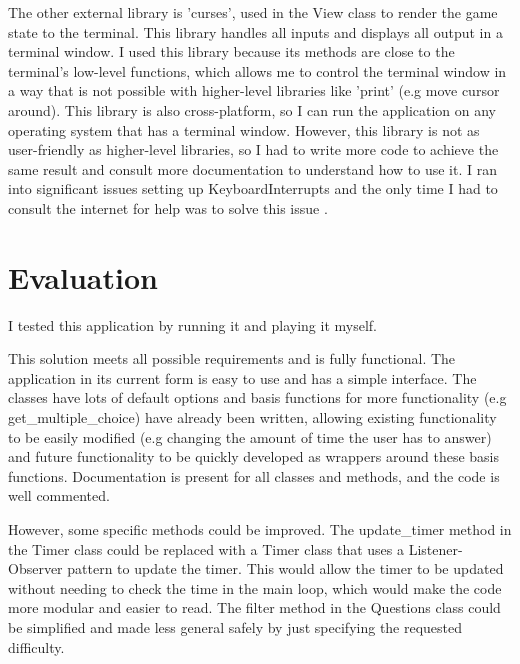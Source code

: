 \documentclass[12pt]{article}
\begin{document}
\vspace{\baselineskip}

The other external library is 'curses', used in the View class to render the game state to the terminal. This library handles all inputs and displays all output in a terminal window. I used this library because its methods are close to the terminal's low-level functions, which allows me to control the terminal window in a way that is not possible with higher-level libraries like 'print' (e.g move cursor around). This library is also cross-platform, so I can run the application on any operating system that has a terminal window. However, this library is not as user-friendly as higher-level libraries, so I had to write more code to achieve the same result and consult more documentation to understand how to use it. I ran into significant issues setting up KeyboardInterrupts and the only time I had to consult the internet for help was to solve this issue \cite{web:2}.

\section{Evaluation}

I tested this application by running it and playing it myself. 

\vspace{\baselineskip}

This solution meets all possible requirements and is fully functional. The application in its current form is easy to use and has a simple interface. The classes have lots of default options and basis functions for more functionality (e.g get\_multiple\_choice) have already been written, allowing existing functionality to be easily modified (e.g changing the amount of time the user has to answer) and future functionality to be quickly developed as wrappers around these basis functions. Documentation is present for all classes and methods, and the code is well commented.

\vspace{\baselineskip}

However, some specific methods could be improved. The update\_timer method in the Timer class could be replaced with a Timer class that uses a Listener-Observer pattern to update the timer. This would allow the timer to be updated without needing to check the time in the main loop, which would make the code more modular and easier to read. The filter method in the Questions class could be simplified and made less general safely by just specifying the requested difficulty.

\printbibliography
\end{document}
